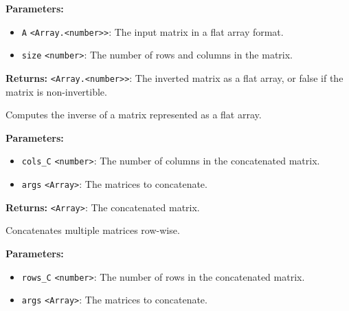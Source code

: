 \documentclass[12pt,a4paper]{article}
\begin{document}
\vspace{5mm}
\noindent {}


\noindent \textbf{Parameters:}
\begin{itemize}
  \item \texttt{A} \texttt{<Array.<number>>}: The input matrix in a flat array format.
  \item \texttt{size} \texttt{<number>}: The number of rows and columns in the matrix.
\end{itemize}

\noindent \textbf{Returns:} \texttt{<Array.<number>>}: The inverted matrix as a flat array, or \textasciigrave{}false\textasciigrave{} if the matrix is non-invertible.

\noindent Computes the inverse of a matrix represented as a flat array.

\vspace{5mm}
\noindent {}


\noindent \textbf{Parameters:}
\begin{itemize}
  \item \texttt{cols\_C} \texttt{<number>}: The number of columns in the concatenated matrix.
  \item \texttt{args} \texttt{<Array>}: The matrices to concatenate.
\end{itemize}

\noindent \textbf{Returns:} \texttt{<Array>}: The concatenated matrix.

\noindent Concatenates multiple matrices row-wise.

\vspace{5mm}
\noindent {}


\noindent \textbf{Parameters:}
\begin{itemize}
  \item \texttt{rows\_C} \texttt{<number>}: The number of rows in the concatenated matrix.
  \item \texttt{args} \texttt{<Array>}: The matrices to concatenate.
\end{itemize}
\end{document}
